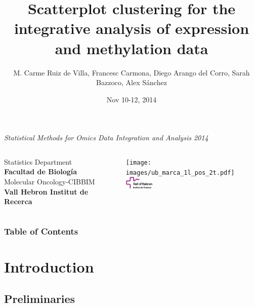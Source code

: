 \documentclass[handout]{beamer}
\title[Scatterplot clustering]{Scatterplot clustering for the integrative analysis of expression and methylation data}
\author[Ruiz de Villa]{M. Carme Ruiz de Villa, Francesc Carmona, Diego Arango del Corro, Sarah Bazzoco, Alex Sánchez}
\date[]{Nov 10-12, 2014}
\begin{document}
\begin{frame}
\begin{scriptsize}
\begin{center}
  \emph{ Statistical Methods for Omics Data Integration and Analysis 2014}
\end{center}
\end{scriptsize}

\titlepage

\begin{columns}
   \scriptsize
   Statistics Department  \\ \textbf{Facultad de Biología}\\
   Molecular Oncology-CIBBIM \\ \textbf{Vall Hebron Institut de Recerca}
    
  \hfill{}
  \texttt{[image: images/ub\_marca\_1l\_pos\_2t.pdf]}\\
 \includegraphics[height=0.6cm]{images/VHIR_fonstransp.png}

\end{columns}
\end{frame}


\begin{frame}
\frametitle{Table of Contents}
\tableofcontents
\end{frame}

\section{Introduction}

\subsection{Preliminaries}
\end{document}
